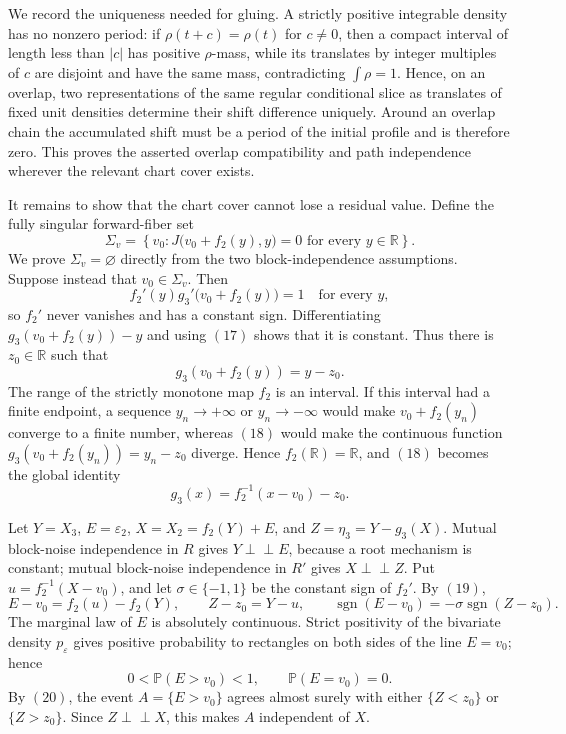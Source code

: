 We record the uniqueness needed for gluing.  A strictly positive integrable density has no nonzero period: if \(\rho(t+c)=\rho(t)\) for \(c\ne0\), then a compact interval of length less than \(|c|\) has positive \(\rho\)-mass, while its translates by integer multiples of \(c\) are disjoint and have the same mass, contradicting \(\int\rho=1\).  Hence, on an overlap, two representations of the same regular conditional slice as translates of fixed unit densities determine their shift difference uniquely.  Around an overlap chain the accumulated shift must be a period of the initial profile and is therefore zero.  This proves the asserted overlap compatibility and path independence wherever the relevant chart cover exists.

It remains to show that the chart cover cannot lose a residual value.  Define the fully singular forward-fiber set
\[
 \Sigma_v=\left\{v_0:J\bigl(v_0+f_2(y),y\bigr)=0
 \text{ for every }y\in\mathbb R\right\}.
\tag{16}
\]
We prove \(\Sigma_v=\varnothing\) directly from the two block-independence assumptions.  Suppose instead that \(v_0\in\Sigma_v\).  Then
\[
 f_2'(y)g_3'\bigl(v_0+f_2(y)\bigr)=1
 \quad\text{for every }y,
\tag{17}
\]
so \(f_2'\) never vanishes and has a constant sign.  Differentiating
\(g_3(v_0+f_2(y))-y\) and using \((17)\) shows that it is constant.  Thus there is \(z_0\in\mathbb R\) such that
\[
 g_3(v_0+f_2(y))=y-z_0.
\tag{18}
\]
The range of the strictly monotone map \(f_2\) is an interval.  If this interval had a finite endpoint, a sequence \(y_n\to+\infty\) or \(y_n\to-\infty\) would make \(v_0+f_2(y_n)\) converge to a finite number, whereas \((18)\) would make the continuous function \(g_3(v_0+f_2(y_n))=y_n-z_0\) diverge.  Hence \(f_2(\mathbb R)=\mathbb R\), and \((18)\) becomes the global identity
\[
 g_3(x)=f_2^{-1}(x-v_0)-z_0.
\tag{19}
\]

Let \(Y=X_3\), \(E=\varepsilon_2\), \(X=X_2=f_2(Y)+E\), and \(Z=\eta_3=Y-g_3(X)\).  Mutual block-noise independence in \(R\) gives \(Y\perp\!\!\!\perp E\), because a root mechanism is constant; mutual block-noise independence in \(R'\) gives \(X\perp\!\!\!\perp Z\).  Put \(u=f_2^{-1}(X-v_0)\), and let \(\sigma\in\{-1,1\}\) be the constant sign of \(f_2'\).  By \((19)\),
\[
 E-v_0=f_2(u)-f_2(Y),
 \qquad
 Z-z_0=Y-u,
 \qquad
 \operatorname{sgn}(E-v_0)=-\sigma\operatorname{sgn}(Z-z_0).
\tag{20}
\]
The marginal law of \(E\) is absolutely continuous.  Strict positivity of the bivariate density \(p_\varepsilon\) gives positive probability to rectangles on both sides of the line \(E=v_0\); hence
\[
 0<\mathbb P(E>v_0)<1,
 \qquad \mathbb P(E=v_0)=0.
\tag{21}
\]
By \((20)\), the event \(A=\{E>v_0\}\) agrees almost surely with either \(\{Z<z_0\}\) or \(\{Z>z_0\}\).  Since \(Z\perp\!\!\!\perp X\), this makes \(A\) independent of \(X\).

